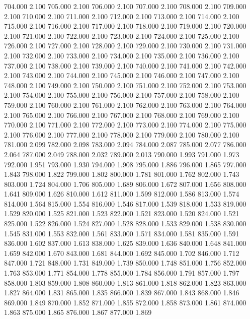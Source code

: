 704.000 2.100 
705.000 2.100 
706.000 2.100 
707.000 2.100 
708.000 2.100 
709.000 2.100 
710.000 2.100 
711.000 2.100 
712.000 2.100 
713.000 2.100 
714.000 2.100 
715.000 2.100 
716.000 2.100 
717.000 2.100 
718.000 2.100 
719.000 2.100 
720.000 2.100 
721.000 2.100 
722.000 2.100 
723.000 2.100 
724.000 2.100 
725.000 2.100 
726.000 2.100 
727.000 2.100 
728.000 2.100 
729.000 2.100 
730.000 2.100 
731.000 2.100 
732.000 2.100 
733.000 2.100 
734.000 2.100 
735.000 2.100 
736.000 2.100 
737.000 2.100 
738.000 2.100 
739.000 2.100 
740.000 2.100 
741.000 2.100 
742.000 2.100 
743.000 2.100 
744.000 2.100 
745.000 2.100 
746.000 2.100 
747.000 2.100 
748.000 2.100 
749.000 2.100 
750.000 2.100 
751.000 2.100 
752.000 2.100 
753.000 2.100 
754.000 2.100 
755.000 2.100 
756.000 2.100 
757.000 2.100 
758.000 2.100 
759.000 2.100 
760.000 2.100 
761.000 2.100 
762.000 2.100 
763.000 2.100 
764.000 2.100 
765.000 2.100 
766.000 2.100 
767.000 2.100 
768.000 2.100 
769.000 2.100 
770.000 2.100 
771.000 2.100 
772.000 2.100 
773.000 2.100 
774.000 2.100 
775.000 2.100 
776.000 2.100 
777.000 2.100 
778.000 2.100 
779.000 2.100 
780.000 2.100 
781.000 2.099 
782.000 2.098 
783.000 2.094 
784.000 2.087 
785.000 2.077 
786.000 2.064 
787.000 2.049 
788.000 2.032 
789.000 2.013 
790.000 1.993 
791.000 1.973 
792.000 1.951 
793.000 1.930 
794.000 1.908 
795.000 1.886 
796.000 1.865 
797.000 1.843 
798.000 1.822 
799.000 1.802 
800.000 1.781 
801.000 1.762 
802.000 1.743 
803.000 1.724 
804.000 1.706 
805.000 1.689 
806.000 1.672 
807.000 1.656 
808.000 1.641 
809.000 1.626 
810.000 1.612 
811.000 1.599 
812.000 1.586 
813.000 1.574 
814.000 1.564 
815.000 1.554 
816.000 1.546 
817.000 1.539 
818.000 1.533 
819.000 1.529 
820.000 1.525 
821.000 1.523 
822.000 1.521 
823.000 1.520 
824.000 1.521 
825.000 1.522 
826.000 1.524 
827.000 1.528 
828.000 1.533 
829.000 1.538 
830.000 1.545 
831.000 1.553 
832.000 1.561 
833.000 1.571 
834.000 1.581 
835.000 1.591 
836.000 1.602 
837.000 1.613 
838.000 1.625 
839.000 1.636 
840.000 1.648 
841.000 1.659 
842.000 1.670 
843.000 1.681 
844.000 1.692 
845.000 1.702 
846.000 1.712 
847.000 1.721 
848.000 1.731 
849.000 1.739 
850.000 1.748 
851.000 1.756 
852.000 1.763 
853.000 1.771 
854.000 1.778 
855.000 1.784 
856.000 1.791 
857.000 1.797 
858.000 1.803 
859.000 1.808 
860.000 1.813 
861.000 1.818 
862.000 1.823 
863.000 1.827 
864.000 1.831 
865.000 1.835 
866.000 1.839 
867.000 1.843 
868.000 1.846 
869.000 1.849 
870.000 1.852 
871.000 1.855 
872.000 1.858 
873.000 1.861 
874.000 1.863 
875.000 1.865 
876.000 1.867 
877.000 1.869 
